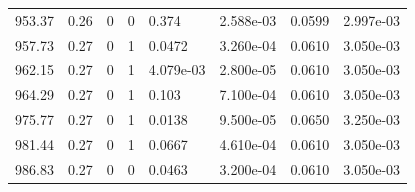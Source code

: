 \documentclass[preview]{standalone}
\begin{document}
{{{{{\begin{tabular}{L{1.2cm}C{1.2cm} C{0.3cm}C{0.5cm} C{1.4cm}C{1.4cm} C{1.4cm}C{1.4cm}}
  953.37  &  0.26  & 0     &  0 &  0.374  & 2.588e-03  & 0.0599 &  2.997e-03   \\ 
  957.73  &  0.27  & 0     &  1 &  0.0472  & 3.260e-04  & 0.0610 &  3.050e-03   \\ 
  962.15  &  0.27  & 0     &  1 &  4.079e-03  & 2.800e-05  & 0.0610 &  3.050e-03   \\ 
  964.29  &  0.27  & 0     &  1 &  0.103  & 7.100e-04  & 0.0610 &  3.050e-03   \\ 
  975.77  &  0.27  & 0     &  1 &  0.0138  & 9.500e-05  & 0.0650 &  3.250e-03   \\ 
  981.44  &  0.27  & 0     &  1 &  0.0667  & 4.610e-04  & 0.0610 &  3.050e-03   \\ 
  986.83  &  0.27  & 0     &  0 &  0.0463  & 3.200e-04  & 0.0610 &  3.050e-03   \\ 
\hline 
\end{tabular} 

}}}}}
\end{document}
